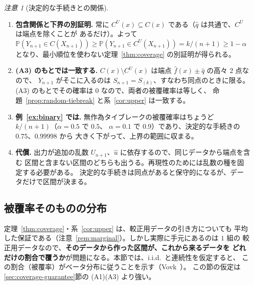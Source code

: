 \documentclass[a4paper,11pt]{jsarticle}
\theoremstyle{definition}
\theoremstyle{plain}
\theoremstyle{remark}
\newtheorem{remark}[definition]{注意}
\newcommand{\Prob}{\mathbb{P}}
\newcommand{\qhat}{\hat{q}}
\newcommand{\fhat}{\hat{f}}
\begin{document}
\begin{remark}[決定的な手続きとの関係]
  \label{rem:tiebreak-vs-det}
  \leavevmode  %
  \begin{enumerate}
    \item \textbf{包含関係と下界の別証明.}
      常に $C^U(x)\subseteq C(x)$ である（$\qhat$ は共通で、$C^U$ は端点を除くことが
      あるだけ）。よって
      $\Prob(Y_{n+1}\in C(X_{n+1}))\ge\Prob(Y_{n+1}\in C^U(X_{n+1}))=k/(n+1)\ge1-\alpha$
      となり、最小順位を使わない定理~\ref{thm:coverage} の別証明が得られる。
    \item \textbf{(A3) のもとでは一致する.}
      $C(x)\setminus C^U(x)$ は端点 $\fhat(x)\pm\qhat$ の高々 $2$ 点なので、
      $Y_{n+1}$ がそこに入るのは $S_{n+1}=S_{(k)}$、すなわち同点のときに限る。
      (A3) のもとでその確率は $0$ なので、両者の被覆確率は等しく、
      命題~\ref{prop:random-tiebreak} と系~\ref{cor:upper} は一致する。
    \item \textbf{例~\ref{ex:binary} では.}
      無作為タイブレークの被覆確率はちょうど $k/(n+1)$（$\alpha=0.5$ で $0.5$、
      $\alpha=0.1$ で $0.9$）であり、決定的な手続きの $0.75$、$0.99998$ から
      大きく下がって、上界の範囲に収まる。
    \item \textbf{代償.}
      出力が追加の乱数 $U_{n+1}$、$\hat u$ に依存するので、同じデータから端点を含む
      区間と含まない区間のどちらも出うる。再現性のためには乱数の種を固定する必要がある。
      決定的な手続きは同点があると保守的になるが、データだけで区間が決まる。
  \end{enumerate}
\end{remark}

\subsection{被覆率そのものの分布}
\label{sec:cond-coverage}

定理~\ref{thm:coverage}・系~\ref{cor:upper} は、較正用データの引き方についても
平均した保証である（注意~\ref{rem:marginal}）。しかし実際に手元にあるのは $1$ 組の
較正用データなので、\textbf{そのデータから作った区間が、これから来るデータを
どれだけの割合で覆うか}が問題になる。本節では、i.i.d.\ と連続性を仮定すると、
この割合（被覆率）がベータ分布に従うことを示す（Vovk~\cite{vovk2012conditional}）。
この節の仮定は \ref{sec:coverage-guarantee}節の (A1)(A3) より強い。
\end{document}
